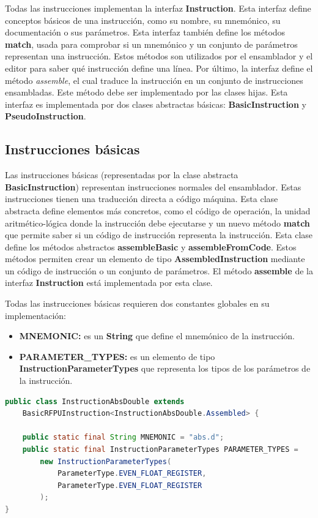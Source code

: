 Todas las instrucciones implementan la interfaz \textbf{Instruction}.
Esta interfaz define conceptos básicos de una instrucción,
como su nombre, su mnemónico, su documentación o sus parámetros.
Esta interfaz también define los métodos \textbf{match},
usada para comprobar si un mnemónico y un conjunto de parámetros
representan una instrucción.
Estos métodos son utilizados por el ensamblador y el editor para saber qué
instrucción define una línea.
Por último, la interfaz define el método \textit{assemble}, el
cual traduce la instrucción en un conjunto de instrucciones ensambladas.
Este método debe ser implementado por las clases hijas.
Esta interfaz es implementada por dos clases abstractas básicas:
\textbf{BasicInstruction} y \textbf{PseudoInstruction}.

\subsection{Instrucciones básicas}\label{subsec:instrucciones-basicas}

Las instrucciones básicas (representadas por la clase abstracta
\textbf{BasicInstruction}) representan instrucciones normales del ensamblador.
Estas instrucciones tienen una traducción directa a código máquina.
Esta clase abstracta define elementos más concretos, como el código de operación,
la unidad aritmético-lógica donde la instrucción debe ejecutarse y
un nuevo método \textbf{match} que permite saber si un código de instrucción
representa la instrucción.
Esta clase define los métodos abstractos \textbf{assembleBasic}
y \textbf{assembleFromCode}.
Estos métodos permiten crear un elemento de tipo \textbf{AssembledInstruction}
mediante un código de instrucción o un conjunto de parámetros.
El método \textbf{assemble} de la interfaz \textbf{Instruction}
está implementada por esta clase.

\noindent Todas las instrucciones básicas requieren dos
constantes globales en su implementación:
\begin{itemize}
    \item \textbf{MNEMONIC:} es un \textbf{String} que define
    el mnemónico de la instrucción.
    \item \textbf{PARAMETER\_TYPES:} es un elemento de tipo
    \textbf{InstructionParameterTypes} que representa
    los tipos de los parámetros de la instrucción.
\end{itemize}

\begin{lstlisting}[language=Java,style=java,frame=single,label={lst:basic-instruction}]
public class InstructionAbsDouble extends
    BasicRFPUInstruction<InstructionAbsDouble.Assembled> {

    public static final String MNEMONIC = "abs.d";
    public static final InstructionParameterTypes PARAMETER_TYPES =
        new InstructionParameterTypes(
            ParameterType.EVEN_FLOAT_REGISTER,
            ParameterType.EVEN_FLOAT_REGISTER
        );
}
\end{lstlisting}

